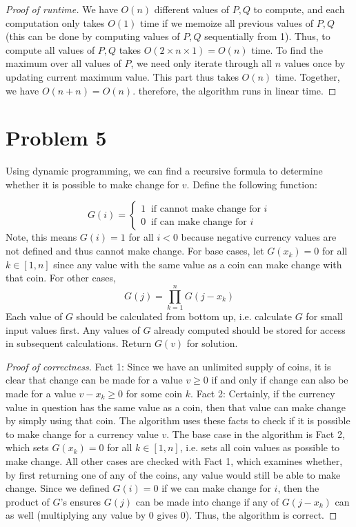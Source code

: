 \documentclass{article}
\begin{document}
\begin{enumerate}[(a)]
\begin{proof}[Proof of runtime]
We have $O(n)$ different values of $P,Q$ to compute, and each computation only takes $O(1)$ time if we memoize all previous values of $P,Q$ (this can be done by computing values of $P,Q$ sequentially from 1). Thus, to compute all values of $P,Q$ takes $O(2\times n\times 1)=O(n)$ time. To find the maximum over all values of $P$, we need only iterate through all $n$ values once by updating current maximum value. This part thus takes $O(n)$ time. Together, we have $O(n+n)=O(n)$. therefore, the algorithm runs in linear time.
\end{proof}



\end{enumerate}

\section*{Problem 5}
Using dynamic programming, we can find a recursive formula to determine whether it is possible to make change for $v$. Define the following function:

$$G(i) = 
\begin{cases}
1 \ \text{   if cannot make change for } i \\
0 \ \text{   if can make change for } i
\end{cases}
$$
Note, this means $G(i)=1$ for all $i<0$ because negative currency values are not defined and thus cannot make change. For base cases, let $G(x_k)=0$ for all $k\in [1,n]$ since any value with the same value as a coin can make change with that coin. For other cases,
$$G(j) = \prod_{k=1}^{n} G(j-x_k)$$
Each value of $G$ should be calculated from bottom up, i.e. calculate $G$ for small input values first. Any values of $G$ already computed should be stored for access in subsequent calculations. Return $G(v)$ for solution.
\begin{proof}[Proof of correctness]
Fact 1: Since we have an unlimited supply of coins, it is clear that change can be made for a value $v\geq 0$ if and only if change can also be made for a value $v-x_k\geq 0$ for some coin $k$. Fact 2: Certainly, if the currency value in question has the same value as a coin, then that value can make change by simply using that coin. The algorithm uses these facts to check if it is possible to make change for a currency value $v$. The base case in the algorithm is Fact 2, which sets $G(x_k)=0$ for all $k\in [1,n]$, i.e. sets all coin values as possible to make change. All other cases are checked with Fact 1, which examines whether, by first returning one of any of the coins, any value would still be able to make change. Since we defined $G(i)=0$ if we can make change for $i$, then the product of $G$'s ensures $G(j)$ can be made into change if any of $G(j-x_k)$ can as well (multiplying any value by 0 gives 0). Thus, the algorithm is correct.
\end{proof}
\end{document}
